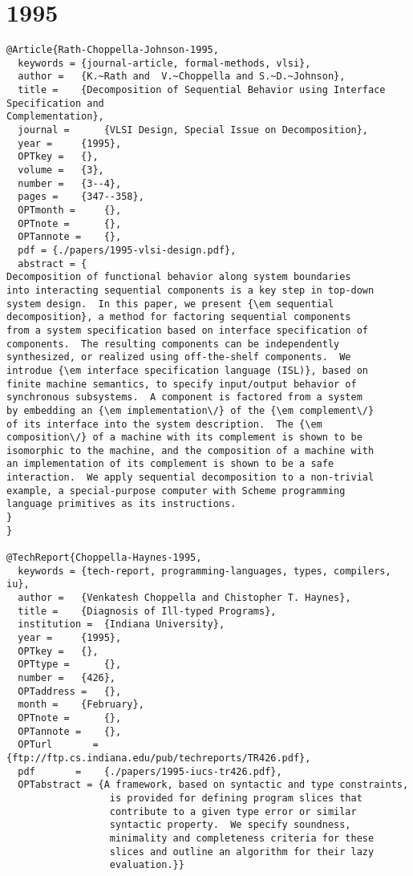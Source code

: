 \documentclass[11pt]{article}
\begin{document}
\section{1995}
\label{sec:org87d7da7}
\lstset{language=bibtex,label= ,caption= ,captionpos=b,numbers=none}
\begin{lstlisting}
@Article{Rath-Choppella-Johnson-1995,
  keywords = {journal-article, formal-methods, vlsi},
  author = 	 {K.~Rath and  V.~Choppella and S.~D.~Johnson},
  title = 	 {Decomposition of Sequential Behavior using Interface Specification and
Complementation},
  journal = 	 {VLSI Design, Special Issue on Decomposition},
  year = 	 {1995},
  OPTkey = 	 {},
  volume = 	 {3},
  number = 	 {3--4},
  pages = 	 {347--358},
  OPTmonth = 	 {},
  OPTnote = 	 {},
  OPTannote = 	 {},
  pdf = {./papers/1995-vlsi-design.pdf},
  abstract = {
Decomposition of functional behavior along system boundaries
into interacting sequential components is a key step in top-down
system design.  In this paper, we present {\em sequential
decomposition}, a method for factoring sequential components
from a system specification based on interface specification of
components.  The resulting components can be independently
synthesized, or realized using off-the-shelf components.  We
introdue {\em interface specification language (ISL)}, based on
finite machine semantics, to specify input/output behavior of
synchronous subsystems.  A component is factored from a system
by embedding an {\em implementation\/} of the {\em complement\/}
of its interface into the system description.  The {\em
composition\/} of a machine with its complement is shown to be
isomorphic to the machine, and the composition of a machine with
an implementation of its complement is shown to be a safe
interaction.  We apply sequential decomposition to a non-trivial
example, a special-purpose computer with Scheme programming
language primitives as its instructions.
}
}

@TechReport{Choppella-Haynes-1995,
  keywords = {tech-report, programming-languages, types, compilers, iu},
  author = 	 {Venkatesh Choppella and Chistopher T. Haynes},
  title = 	 {Diagnosis of Ill-typed Programs},
  institution =  {Indiana University},
  year = 	 {1995},
  OPTkey = 	 {},
  OPTtype = 	 {},
  number = 	 {426},
  OPTaddress = 	 {},
  month = 	 {February},
  OPTnote = 	 {},
  OPTannote = 	 {},
  OPTurl       =    {ftp://ftp.cs.indiana.edu/pub/techreports/TR426.pdf},
  pdf       =    {./papers/1995-iucs-tr426.pdf},
  OPTabstract = {A framework, based on syntactic and type constraints,
                  is provided for defining program slices that
                  contribute to a given type error or similar
                  syntactic property.  We specify soundness,
                  minimality and completeness criteria for these
                  slices and outline an algorithm for their lazy
                  evaluation.}}


\end{lstlisting}
\end{document}
